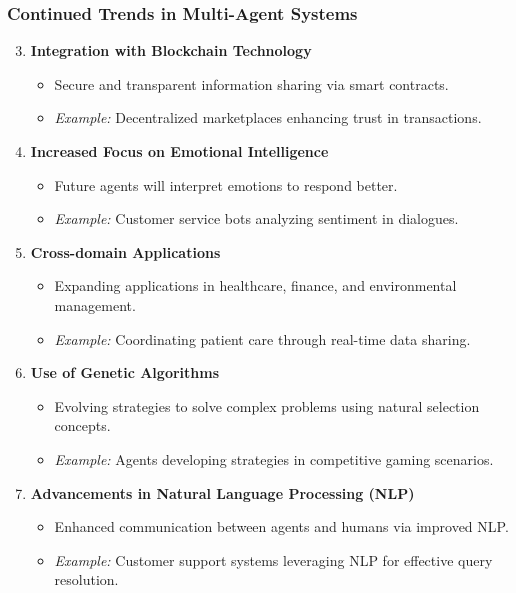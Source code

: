 \documentclass[aspectratio=169]{beamer}
\begin{document}
\begin{frame}[fragile]
    \frametitle{Continued Trends in Multi-Agent Systems}
    \begin{enumerate}
        \setcounter{enumi}{2}
        \item \textbf{Integration with Blockchain Technology}
        \begin{itemize}
            \item Secure and transparent information sharing via smart contracts.
            \item \textit{Example:} Decentralized marketplaces enhancing trust in transactions.
        \end{itemize}
        
        \item \textbf{Increased Focus on Emotional Intelligence}
        \begin{itemize}
            \item Future agents will interpret emotions to respond better.
            \item \textit{Example:} Customer service bots analyzing sentiment in dialogues.
        \end{itemize}

        \item \textbf{Cross-domain Applications}
        \begin{itemize}
            \item Expanding applications in healthcare, finance, and environmental management.
            \item \textit{Example:} Coordinating patient care through real-time data sharing.
        \end{itemize}
        
        \item \textbf{Use of Genetic Algorithms}
        \begin{itemize}
            \item Evolving strategies to solve complex problems using natural selection concepts.
            \item \textit{Example:} Agents developing strategies in competitive gaming scenarios.
        \end{itemize}
        
        \item \textbf{Advancements in Natural Language Processing (NLP)}
        \begin{itemize}
            \item Enhanced communication between agents and humans via improved NLP.
            \item \textit{Example:} Customer support systems leveraging NLP for effective query resolution.
        \end{itemize}
    \end{enumerate}
\end{frame}
\end{document}
